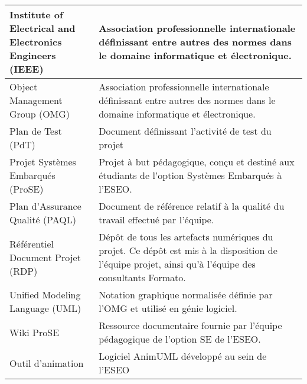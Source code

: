 \documentclass[a4paper,11pt,titlepage]{article}
\begin{document}
\begin{longtable}{|p{0.3\linewidth}|p{0.7\linewidth}|}
    Institute of Electrical and Electronics Engineers (IEEE) & Association professionnelle internationale définissant entre autres des normes dans le domaine informatique et électronique.                                                                     \\ \hline
    Object Management Group (OMG)                            & Association professionnelle internationale définissant entre autres des normes dans le domaine informatique et électronique.                                                                     \\ \hline
    Plan de Test (PdT)                                       & Document définissant l'activité de test du projet                                                                                                                                                \\ \hline
    Projet Systèmes Embarqués (ProSE)                        & Projet à but pédagogique, conçu et destiné aux étudiants de l'option Systèmes Embarqués à l'ESEO.                                                                                                \\ \hline
    Plan d'Assurance Qualité (PAQL)                          & Document de référence relatif à la qualité du travail effectué par l'équipe.                                                                                                                     \\ \hline
    Référentiel Document Projet (RDP)                        & Dépôt de tous les artefacts numériques du projet. Ce dépôt est mis à la disposition de l'équipe projet, ainsi qu'à l'équipe des consultants Formato.                                             \\ \hline
    Unified Modeling Language (UML)                          & Notation graphique normalisée définie par l'OMG et utilisé en génie logiciel.                                                                                                                    \\ \hline
    Wiki ProSE                                               & Ressource documentaire fournie par l'équipe pédagogique de l'option SE de l'ESEO.                                                                                                                \\ \hline
    Outil d'animation                                        & Logiciel AnimUML développé au sein de l'ESEO                                                                                                                                                     \\ \hline

\end{longtable}
\end{document}
